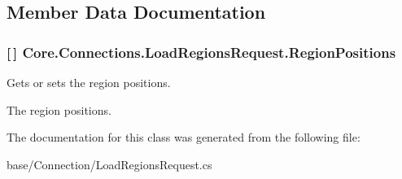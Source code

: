 \subsection{Member Data Documentation}
\hypertarget{classCore_1_1Connections_1_1LoadRegionsRequest_a218b8fc9a7dc007031abe6344dc3dc64}{}
\subsubsection[{Region\+Positions}]{ \mbox{[}$\,$\mbox{]} Core.\+Connections.\+Load\+Regions\+Request.\+Region\+Positions}\label{classCore_1_1Connections_1_1LoadRegionsRequest_a218b8fc9a7dc007031abe6344dc3dc64}


Gets or sets the region positions. 

The region positions.

The documentation for this class was generated from the following file\+:\begin{DoxyCompactItemize}
\item 
base/\+Connection/Load\+Regions\+Request.\+cs\end{DoxyCompactItemize}
